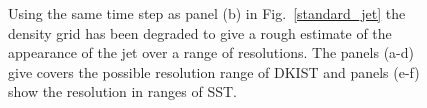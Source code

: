 \documentclass[12pt]{ociamthesis}
\begin{document}
\begin{figure}
\captionsetup[subfigure]{labelformat=empty}
\centering
{}
\caption{Using the same time step as panel (b) in Fig.~\ref{standard_jet} the density grid has been degraded to give a rough estimate of the appearance of the jet over a range of resolutions. The panels (a-d) give covers the possible resolution range of DKIST and panels (e-f) show the resolution in ranges of SST.}
\label{degrid}
\end{figure}



\end{document}
